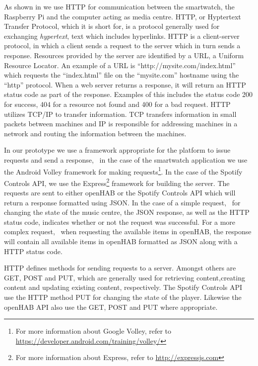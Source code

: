 As shown in  we use HTTP for communication between the smartwatch, the Raspberry Pi and the computer acting as media centre. HTTP, or Hyptertext Transfer Protocol, which it is short for, is a protocol generally used for exchanging \emph{hypertext}, text which includes hyperlinks. HTTP is a client-server protocol, in which a client sends a request to the server which in turn sends a response. Resources provided by the server are identified by a URL, a Uniform Resource Locator. An example of a URL is ``http://mysite.com/index.html'' which requests the ``index.html'' file on the ``mysite.com'' hostname using the ``http'' protocol. When a web server returns a response, it will return an HTTP status code as part of the response. Examples of this includes the status code 200 for success, 404 for a resource not found and 400 for a bad request. HTTP utilizes TCP/IP to transfer information. TCP transfers information in small packets between machines and IP is responsible for addressing machines in a network and routing the information between the machines.

In our prototype we use a framework appropriate for the platform to issue requests and send a response, \eg~in the case of the smartwatch application we use the Android Volley framework for making requests\footnote{For more information about Google Volley, refer to \url{https://developer.android.com/training/volley/}}. In the case of the Spotify Controls API, we use the Express\footnote{For more information about Express, refer to \url{http://expressjs.com}} framework for building the server. The requests are sent to either openHAB or the Spotify Controls API which will return a response formatted using JSON. In the case of a simple request, \eg~for changing the state of the music centre, the JSON response, as well as the HTTP status code, indicates whether or not the request was successful. For a more complex request, \eg~when requesting the available items in openHAB, the response will contain all available items in openHAB formatted as JSON along with a HTTP status code.

HTTP defines methods for sending requests to a server. Amongst others are GET, POST and PUT, which are generally used for retrieving content,creating content and updating existing content, respectively. The Spotify Controls API use the HTTP method PUT for changing the state of the player. Likewise the openHAB API also use the GET, POST and PUT where appropriate.


